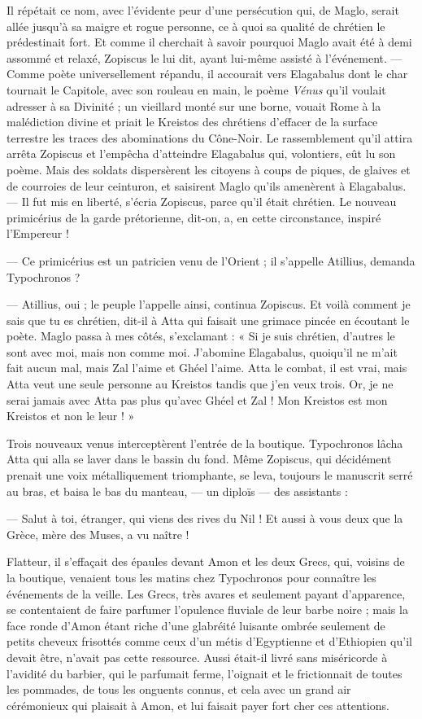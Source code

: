 \documentclass[a4paper, 11pt, oneside, polutonikogreek, french]{article}
\begin{document}
Il répétait ce nom, avec l'évidente peur d'une persécution qui, de Maglo, serait allée jusqu'à sa maigre et rogue personne, ce à quoi sa qualité de chrétien le prédestinait fort. Et comme il cherchait à savoir pourquoi Maglo avait été à demi assommé et relaxé, Zopiscus le lui dit, ayant lui-même assisté à l'événement. --- Comme poète universellement répandu, il accourait vers Elagabalus dont le char tournait le Capitole, avec son rouleau en main, le poème \emph{Vénus} qu'il voulait adresser à sa Divinité ; un vieillard monté sur une borne, vouait Rome à la malédiction divine et priait le Kreistos des chrétiens d'effacer de la surface terrestre les traces des abominations du Cône-Noir. Le rassemblement qu'il attira arrêta Zopiscus et l'empêcha d'atteindre Elagabalus qui, volontiers, eût lu son poème. Mais des soldats dispersèrent les citoyens à coups de piques, de glaives et de courroies de leur ceinturon, et saisirent Maglo qu'ils amenèrent à Elagabalus. --- Il fut mis en liberté, s'écria Zopiscus, parce qu'il était chrétien. Le nouveau primicérius de la garde prétorienne, dit-on, a, en cette circonstance, inspiré l'Empereur !

--- Ce primicérius est un patricien venu de l'Orient ; il s'appelle Atillius, demanda Typochronos ?

--- Atillius, oui ; le peuple l'appelle ainsi, continua Zopiscus. Et voilà comment je sais que tu es chrétien, dit-il à Atta qui faisait une grimace pincée en écoutant le poète. Maglo passa à mes côtés, s'exclamant : « Si je suis chrétien, d'autres le sont avec moi, mais non comme moi. J'abomine Elagabalus, quoiqu'il ne m'ait fait aucun mal, mais Zal l'aime et Ghéel l'aime. Atta le combat, il est vrai, mais Atta veut une seule personne au Kreistos tandis que j'en veux trois. Or, je ne serai jamais avec Atta pas plus qu'avec Ghéel et Zal ! Mon Kreistos est mon Kreistos et non le leur ! »

Trois nouveaux venus interceptèrent l'entrée de la boutique. Typochronos lâcha Atta qui alla se laver dans le bassin du fond. Même Zopiscus, qui décidément prenait une voix métalliquement triomphante, se leva, toujours le manuscrit serré au bras, et baisa le bas du manteau, --- un diploïs --- des assistants :

--- Salut à toi, étranger, qui viens des rives du Nil ! Et aussi à vous deux que la Grèce, mère des Muses, a vu naître !

Flatteur, il s'effaçait des épaules devant Amon et les deux Grecs, qui, voisins de la boutique, venaient tous les matins chez Typochronos pour connaître les événements de la veille. Les Grecs, très avares et seulement payant d'apparence, se contentaient de faire parfumer l'opulence fluviale de leur barbe noire ; mais la face ronde d'Amon étant riche d'une glabréité luisante ombrée seulement de petits cheveux frisottés comme ceux d'un métis d'Egyptienne et d'Ethiopien qu'il devait être, n'avait pas cette ressource. Aussi était-il livré sans miséricorde à l'avidité du barbier, qui le parfumait ferme, l'oignait et le frictionnait de toutes les pommades, de tous les onguents connus, et cela avec un grand air cérémonieux qui plaisait à Amon, et lui faisait payer fort cher ces attentions.
\end{document}

